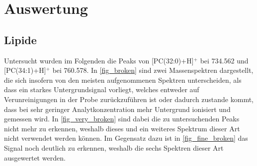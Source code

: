 \clearpage
\section{Auswertung}

\subsection{Lipide}

Untersucht wurden im Folgenden die Peaks von [PC(32:0)+H]$^+$ bei \SI{734.562}{} und [PC(34:1)+H]$^+$ bei \SI{760,578}{}.
In \cref{fig_broken} sind zwei Massenspektren dargestellt, die sich insofern von den meisten aufgenommenen Spektren unterscheiden, als dass ein starkes Untergrundsignal vorliegt, welches entweder auf Verunreinigungen in der Probe zurückzuführen ist oder dadurch zustande kommt, dass bei sehr geringer Analytkonzentration mehr Untergrund ionisiert und gemessen wird.
In \cref{fig_very_broken} sind dabei die zu untersuchenden Peaks nicht mehr zu erkennen, weshalb dieses und ein weiteres Spektrum dieser Art nicht verwendet werden können.
Im Gegensatz dazu ist in \cref{fig_fine_broken} das Signal noch deutlich zu erkennen, weshalb die sechs Spektren dieser Art ausgewertet werden.

